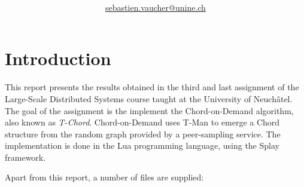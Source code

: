 \documentclass[11pt,a4paper,parskip=half]{scrartcl}
\author{\myauthor\\ \href{mailto:sebastien.vaucher@unine.ch}{sebastien.vaucher@unine.ch}}
\title{\huge \textbf{\mytitle}}
\begin{document}
\begin{titlingpage}

\begin{otherlanguage}{australian}
\maketitle
\end{otherlanguage}

\tableofcontents

\begin{table}[b]
\centering
{}
\qquad\qquad
{}
\end{table}

\end{titlingpage}

\pagebreak

\section{Introduction}

This report presents the results obtained in the third and last assignment of the Large-Scale Distributed Systems course taught at the University of Neuchâtel.
The goal of the assignment is the implement the Chord-on-Demand \autocite{cod} algorithm, also known as \textit{T-Chord}.
Chord-on-Demand uses T-Man \autocite{tman} to emerge a Chord \autocite{chord} structure from the random graph provided by a peer-sampling service.
The implementation is done in the Lua programming language, using the Splay framework.

Apart from this report, a number of files are supplied:
\end{document}
